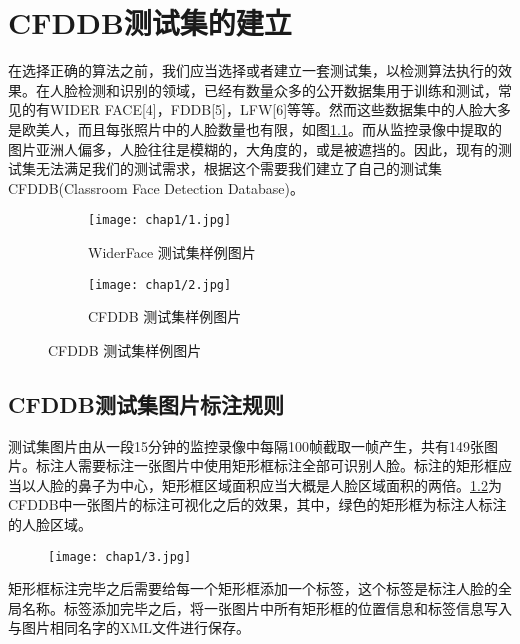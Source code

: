 \chapter{CFDDB测试集的建立}
\label{chap:establishCFDDB}

在选择正确的算法之前，我们应当选择或者建立一套测试集，以检测算法执行的效果。在人脸检测和识别的领域，已经有数量众多的公开数据集用于训练和测试，常见的有WIDER FACE[4]，FDDB[5]，LFW[6]等等。然而这些数据集中的人脸大多是欧美人，而且每张照片中的人脸数量也有限，如图\ref{fig:chap1:pic}。而从监控录像中提取的图片亚洲人偏多，人脸往往是模糊的，大角度的，或是被遮挡的。因此，现有的测试集无法满足我们的测试需求，根据这个需要我们建立了自己的测试集CFDDB(Classroom Face Detection Database)。


\begin{figure}[!htp]
	\centering
	\begin{subfigure}{6cm}
		\centering
		\texttt{[image: chap1/1.jpg]}
		\caption{WiderFace 测试集样例图片}
	\end{subfigure}
	\hspace{4em}
	\begin{subfigure}{6cm}
		\centering
		\texttt{[image: chap1/2.jpg]}
		\caption{CFDDB 测试集样例图片}
	\end{subfigure}
	\label{fig:chap1:pic}
\end{figure}


\section{CFDDB测试集图片标注规则}

测试集图片由从一段15分钟的监控录像中每隔100帧截取一帧产生，共有149张图片。标注人需要标注一张图片中使用矩形框标注全部可识别人脸。标注的矩形框应当以人脸的鼻子为中心，矩形框区域面积应当大概是人脸区域面积的两倍。\ref{fig:chap1:cfddblbexp}为CFDDB中一张图片的标注可视化之后的效果，其中，绿色的矩形框为标注人标注的人脸区域。

\begin{figure}[!htp]
	\centering
	\texttt{[image: chap1/3.jpg]}
	\label{fig:chap1:cfddblbexp}
\end{figure}

矩形框标注完毕之后需要给每一个矩形框添加一个标签，这个标签是标注人脸的全局名称。标签添加完毕之后，将一张图片中所有矩形框的位置信息和标签信息写入与图片相同名字的XML文件进行保存。

